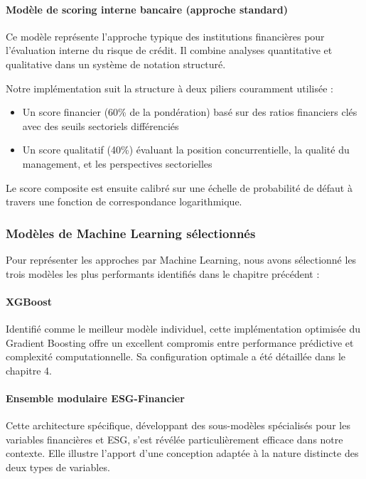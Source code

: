 \paragraph{Modèle de scoring interne bancaire (approche standard)} Ce modèle représente l'approche typique des institutions financières pour l'évaluation interne du risque de crédit. Il combine analyses quantitative et qualitative dans un système de notation structuré.

Notre implémentation suit la structure à deux piliers couramment utilisée :
\begin{itemize}
    \item Un score financier (60\% de la pondération) basé sur des ratios financiers clés avec des seuils sectoriels différenciés
    \item Un score qualitatif (40\%) évaluant la position concurrentielle, la qualité du management, et les perspectives sectorielles
\end{itemize}

Le score composite est ensuite calibré sur une échelle de probabilité de défaut à travers une fonction de correspondance logarithmique.

\subsubsection{Modèles de Machine Learning sélectionnés}

Pour représenter les approches par Machine Learning, nous avons sélectionné les trois modèles les plus performants identifiés dans le chapitre précédent :

\paragraph{XGBoost} Identifié comme le meilleur modèle individuel, cette implémentation optimisée du Gradient Boosting offre un excellent compromis entre performance prédictive et complexité computationnelle. Sa configuration optimale a été détaillée dans le chapitre 4.

\paragraph{Ensemble modulaire ESG-Financier} Cette architecture spécifique, développant des sous-modèles spécialisés pour les variables financières et ESG, s'est révélée particulièrement efficace dans notre contexte. Elle illustre l'apport d'une conception adaptée à la nature distincte des deux types de variables.

